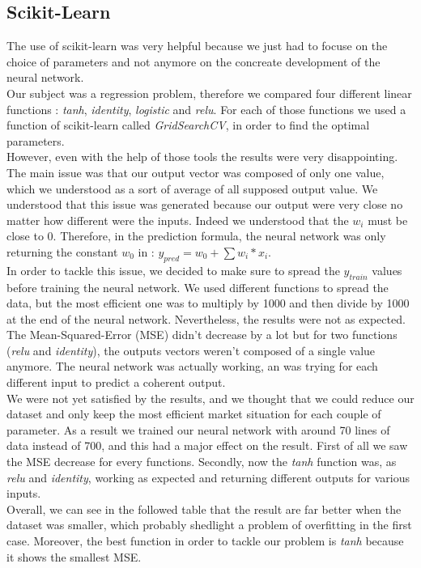 \documentclass[]{article}
\begin{document}
\subsection{Scikit-Learn}
\vskip 0.5cm
The use of scikit-learn was very helpful because we just had to focuse on the choice of parameters and not anymore on the concreate development of the neural network.\\
Our subject was a regression problem, therefore we compared four different linear functions : \textit{tanh}, \textit{identity}, \textit{logistic} and \textit{relu}.
For each of those functions we used a function of scikit-learn called \textit{GridSearchCV}, in order to find the optimal parameters. \\
However, even with the help of those tools the results were very disappointing. The main issue was that our output vector was composed of only one value, which we understood as a sort of average of all supposed output value. We understood that this issue was generated because our output were very close no matter how different were the inputs. Indeed we understood that the \(w_{i}\) must be close to 0. Therefore, in the prediction formula, the neural network was only returning the constant \(w_{0}\) in : \(y_{pred} = w_{0} + \sum w_{i}*x_{i}\).\\

In order to tackle this issue, we decided to make sure to spread the \(y_{train}\) values before training the neural network. We used different functions to spread the data, but the most efficient one was to multiply by 1000 and then divide by 1000 at the end of the neural network. Nevertheless, the results were not as expected. The Mean-Squared-Error (MSE) didn't decrease by a lot but for two functions (\textit{relu} and \textit{identity}), the outputs vectors weren't composed of a single value anymore. The neural network was actually working, an was trying for each different input to predict a coherent output.\\
We were not yet satisfied by the results, and we thought that we could reduce our dataset and only keep the most efficient market situation for each couple of parameter. As a result we trained our neural network with around 70 lines of data instead of 700, and this had a major effect on the result. First of all we saw the MSE decrease for every functions. Secondly, now the \textit{tanh} function was, as \textit{relu} and \textit{identity}, working as expected and returning different outputs for various inputs. \\
Overall, we can see in the followed table that the result are far better when the dataset was smaller, which probably shedlight a problem of overfitting in the first case. Moreover, the best function in order to tackle our problem is \textit{tanh} because it shows the smallest MSE.\\
\end{document}
